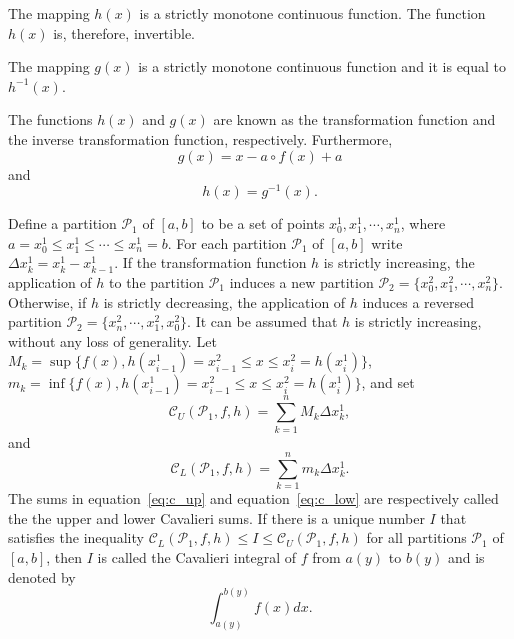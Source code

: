 \documentclass[twoside,reqno,11pt]{fcaa-var} %
\begin{document}
\begin{theorem}
The mapping $h(x)$ is a strictly monotone continuous function. The function $h(x)$ is, therefore, invertible.
\end{theorem}

\begin{theorem}
\label{t:inv}
The mapping $g(x)$ is a strictly monotone continuous function and it is equal to $h^{-1}(x)$.
\end{theorem}

\noindent
The functions $h(x)$ and $g(x)$ are known as the transformation function and the inverse transformation function, respectively. Furthermore,
\begin{equation}
\label{eq:g_def}
g(x) = x - a\circ f(x) + a 
\end{equation}
and
\begin{equation}
\label{eq:h_def}
h(x) = g^{-1}(x). 
\end{equation}

\begin{definition}\label{def:cav_integral}
Define a partition $\mathcal{P}_1$ of $[a,b]$ to be a set of points $x_0^1, x_1^1,\cdots,x_n^1$, 
where $a = x_0^1 \leq x_1^1 \leq \cdots \leq x_n^1 = b$. For each partition 
$\mathcal{P}_1$ of $[a,b]$ write $\Delta x_k^1 = x_k^1-x_{k-1}^1$. 
If the transformation function $h$ is strictly increasing,
the application of $h$ to the partition $\mathcal{P}_1$ induces a new partition $\mathcal{P}_2 = \{x_0^2, x_1^2,\cdots, x_n^2\}$.
Otherwise, if $h$ is strictly decreasing, the application of $h$ induces a reversed partition $\mathcal{P}_2 = \{x_n^2, \cdots, x_1^2,x_0^2\}$. It
can be assumed that $h$ is strictly increasing, without any loss of generality.  Let 
$M_k = \sup \{f (x), h(x_{i-1}^1) = x_{i-1}^2 \leq x \leq x_i^2 = h(x_i^1)\}$, $m_k = \inf \{f (x), h(x_{i-1}^1) = x_{i-1}^2 \leq x \leq x_i^2 = h(x_i^1)\}$, and set 
\begin{equation}
\label{eq:c_up}
\mathcal{C}_U(\mathcal{P}_1,f,h) = \sum_{k=1}^n M_k \Delta x_k^1, 
\end{equation}
and
\begin{equation}
\label{eq:c_low}
\mathcal{C}_L(\mathcal{P}_1,f,h) = \sum_{k=1}^n m_k \Delta x_k^1. 
\end{equation}
The sums in equation~\eqref{eq:c_up} and equation~\eqref{eq:c_low} are respectively called the the upper and lower Cavalieri sums.
If there is a unique number $I$ that satisfies the inequality $\mathcal{C}_L(\mathcal{P}_1,f,h)\leq I \leq \mathcal{C}_U(\mathcal{P}_1,f,h)$ for all 
partitions $\mathcal{P}_1$ of $[a,b]$, then $I$ is called the Cavalieri integral of $f$ from $a(y)$ to $b(y)$ and is denoted by
\begin{equation}
\int_{a(y)}^{b(y)} f(x) dx.
\end{equation}
\end{definition}
\end{document}
